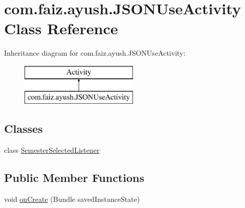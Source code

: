 \hypertarget{classcom_1_1faiz_1_1ayush_1_1_j_s_o_n_use_activity}{}\section{com.\+faiz.\+ayush.\+J\+S\+O\+N\+Use\+Activity Class Reference}
\label{classcom_1_1faiz_1_1ayush_1_1_j_s_o_n_use_activity}
Inheritance diagram for com.\+faiz.\+ayush.\+J\+S\+O\+N\+Use\+Activity\+:\begin{figure}[H]
\begin{center}
\leavevmode
\includegraphics[height=2.000000cm]{classcom_1_1faiz_1_1ayush_1_1_j_s_o_n_use_activity}
\end{center}
\end{figure}
\subsection*{Classes}
\begin{DoxyCompactItemize}
\item 
class \hyperlink{classcom_1_1faiz_1_1ayush_1_1_j_s_o_n_use_activity_1_1_semester_selected_listener}{Semester\+Selected\+Listener}
\end{DoxyCompactItemize}
\subsection*{Public Member Functions}
\begin{DoxyCompactItemize}
\item 
void \hyperlink{classcom_1_1faiz_1_1ayush_1_1_j_s_o_n_use_activity_a3b33ba1c6ec0a7f465f001071f60bc67}{on\+Create} (Bundle saved\+Instance\+State)
\end{DoxyCompactItemize}
